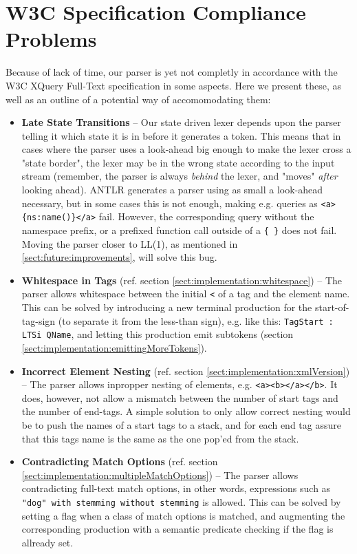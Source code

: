 \section{W3C Specification Compliance Problems}
\label{sect:future:knownBugs}
Because of lack of time, our parser is yet not completly in accordance with the
W3C XQuery Full-Text specification in some aspects. Here we present these, as
well as an outline of a potential way of accomomodating them: 

\begin{itemize}
\item \textbf{Late State Transitions} -- Our state driven lexer depends upon the parser telling it which state it is in before it generates a token. This means that in cases where the parser uses a look-ahead big enough to make the lexer cross a "state border", the lexer may be in the wrong state according to the input stream (remember, the parser is always \emph{behind} the lexer, and "moves" \emph{after} looking ahead). ANTLR generates a parser using as small a look-ahead necessary, but in some cases this is not enough, making e.g. queries as \verb!<a>{ns:name()}</a>! fail. However, the corresponding query without the namespace prefix, or a prefixed function call outside of a \verb!{ }! does not fail. Moving the parser closer to LL(1), as mentioned in \ref{sect:future:improvements}, will solve this bug.

\item \textbf{Whitespace in Tags} (ref. section \ref{sect:implementation:whitespace}) -- The parser allows whitespace between the initial \verb!<! of a tag and the element name. This can be solved by introducing a new terminal production for the start-of-tag-sign (to separate it from the less-than sign), e.g. like this: \verb!TagStart : LTSi QName!, and letting this production emit subtokens (section \ref{sect:implementation:emittingMoreTokens}).

\item \textbf{Incorrect Element Nesting} (ref. section \ref{sect:implementation:xmlVersion}) -- The parser allows inpropper nesting of elements, e.g. \verb!<a><b></a></b>!. It does, however, not allow a mismatch between the number of start tags and the number of end-tags. A simple solution to only allow correct nesting would be to push the names of a start tags to a stack, and for each end tag assure that this tags name is the same as the one pop'ed from the stack.

\item \textbf{Contradicting Match Options} (ref. section \ref{sect:implementation:multipleMatchOptions}) -- The parser allows contradicting full-text match options, in other words, expressions such as \verb!"dog" with stemming without stemming! is allowed. This can be solved by setting a flag when a class of match options is matched, and augmenting the corresponding production with a semantic predicate checking if the flag is allready set.


\end{itemize}
